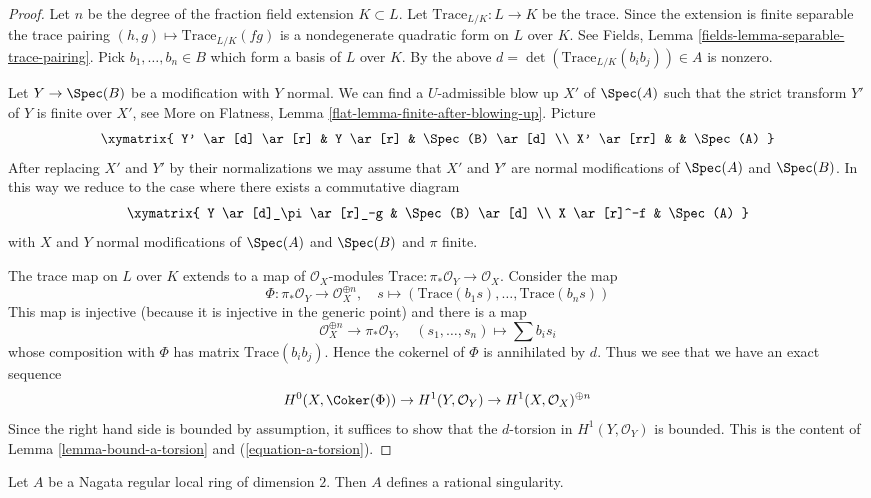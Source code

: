 \begin{proof}
Let $n$ be the degree of the fraction field extension $K \subset L$.
Let $\text{Trace}_{L/K} : L \to K$ be the trace. Since the extension is finite
separable the trace pairing $(h, g) \mapsto \text{Trace}_{L/K}(fg)$
is a nondegenerate quadratic form on $L$ over $K$. See
Fields, Lemma \ref{fields-lemma-separable-trace-pairing}.
Pick $b_1, \ldots, b_n \in B$ which form a basis of $L$ over $K$.
By the above $d = \det(\text{Trace}_{L/K}(b_ib_j)) \in A$ is nonzero.

\medskip\noindent
Let $Y \to \Spec(B)$ be a modification with $Y$ normal. We can find
a $U$-admissible blow up $X'$ of $\Spec(A)$ such that the strict transform
$Y'$ of $Y$ is finite over $X'$, see More on Flatness, Lemma
\ref{flat-lemma-finite-after-blowing-up}. Picture
$$
\xymatrix{
Y' \ar[d] \ar[r] & Y \ar[r] & \Spec(B) \ar[d] \\
X' \ar[rr] & & \Spec(A)
}
$$
After replacing $X'$ and $Y'$ by their normalizations we may assume that
$X'$ and $Y'$ are normal modifications of $\Spec(A)$ and $\Spec(B)$.
In this way we reduce to the case where there exists a commutative diagram
$$
\xymatrix{
Y \ar[d]_\pi \ar[r]_-g & \Spec(B) \ar[d] \\
X \ar[r]^-f & \Spec(A)
}
$$
with $X$ and $Y$ normal modifications of $\Spec(A)$ and $\Spec(B)$ and
$\pi$ finite.

\medskip\noindent
The trace map on $L$ over $K$ extends to a map of $\mathcal{O}_X$-modules
$\text{Trace} : \pi_*\mathcal{O}_Y \to \mathcal{O}_X$. Consider the map
$$
\Phi : \pi_*\mathcal{O}_Y \longrightarrow \mathcal{O}_X^{\oplus n},\quad
s \longmapsto (\text{Trace}(b_1s), \ldots, \text{Trace}(b_ns))
$$
This map is injective (because it is injective in the generic point)
and there is a map
$$
\mathcal{O}_X^{\oplus n} \longrightarrow \pi_*\mathcal{O}_Y,\quad
(s_1, \ldots, s_n) \longmapsto \sum b_i s_i
$$
whose composition with $\Phi$ has matrix $\text{Trace}(b_ib_j)$.
Hence the cokernel of $\Phi$ is annihilated by $d$. Thus we see that
we have an exact sequence
$$
H^0(X, \Coker(\Phi)) \to H^1(Y, \mathcal{O}_Y) \to
H^1(X, \mathcal{O}_X)^{\oplus n}
$$
Since the right hand side is bounded by assumption, it suffices to show
that the $d$-torsion in $H^1(Y, \mathcal{O}_Y)$ is bounded.
This is the content of Lemma \ref{lemma-bound-a-torsion} and
(\ref{equation-a-torsion}).
\end{proof}

\begin{lemma}
\label{lemma-regular-rational}
Let $A$ be a Nagata regular local ring of dimension $2$. Then $A$ defines
a rational singularity.
\end{lemma}

